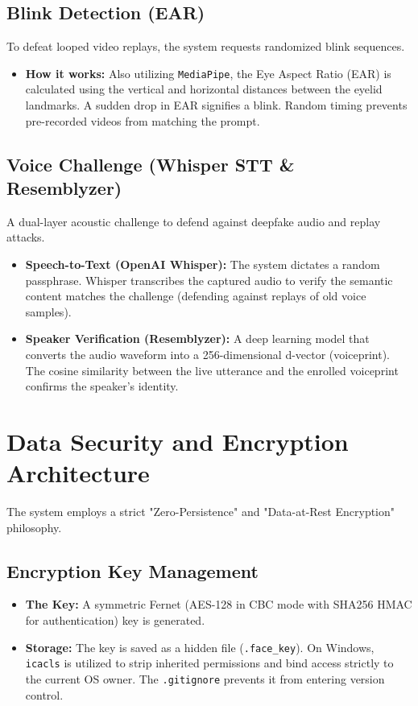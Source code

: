 \documentclass[12pt,a4paper]{article}
\begin{document}
\subsection{Blink Detection (EAR)}
To defeat looped video replays, the system requests randomized blink sequences.
\begin{itemize}
    \item \textbf{How it works:} Also utilizing \texttt{MediaPipe}, the Eye Aspect Ratio (EAR) is calculated using the vertical and horizontal distances between the eyelid landmarks. A sudden drop in EAR signifies a blink. Random timing prevents pre-recorded videos from matching the prompt.
\end{itemize}

\subsection{Voice Challenge (Whisper STT \& Resemblyzer)}
A dual-layer acoustic challenge to defend against deepfake audio and replay attacks.
\begin{itemize}
    \item \textbf{Speech-to-Text (OpenAI Whisper):} The system dictates a random passphrase. Whisper transcribes the captured audio to verify the semantic content matches the challenge (defending against replays of old voice samples).
    \item \textbf{Speaker Verification (Resemblyzer):} A deep learning model that converts the audio waveform into a 256-dimensional d-vector (voiceprint). The cosine similarity between the live utterance and the enrolled voiceprint confirms the speaker's identity.
\end{itemize}

\section{Data Security and Encryption Architecture}
The system employs a strict "Zero-Persistence" and "Data-at-Rest Encryption" philosophy. 

\subsection{Encryption Key Management}
\begin{itemize}
    \item \textbf{The Key:} A symmetric Fernet (AES-128 in CBC mode with SHA256 HMAC for authentication) key is generated.
    \item \textbf{Storage:} The key is saved as a hidden file (\texttt{.face\_key}). On Windows, \texttt{icacls} is utilized to strip inherited permissions and bind access strictly to the current OS owner. The \texttt{.gitignore} prevents it from entering version control.
\end{itemize}
\end{document}
